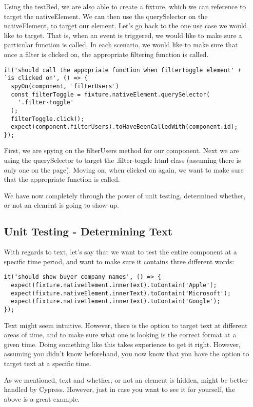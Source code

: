 Using the testBed, we are also able to create a fixture, which we can reference
to target the nativeElement. We can then use the querySelector on the
nativeElement, to target our element. Let's go back to the one use case we
would like to target. That is, when an event is triggered, we would like to
make sure a particular function is called. In each scenario, we would like to
make sure that once a filter is clicked on, the appropriate filtering function
is called.

\begin{lstlisting}
it('should call the appopriate function when filterToggle element' +
`is clicked on', () => {
  spyOn(component, 'filterUsers')
  const filterToggle = fixture.nativeElement.querySelector(
    '.filter-toggle'
  );
  filterToggle.click();
  expect(component.filterUsers).toHaveBeenCalledWith(component.id);
});
\end{lstlisting}

First, we are spying on the filterUsers method for our component. Next we are
using the querySelector to target the .filter-toggle html class (assuming there
is only one on the page). Moving on, when clicked on again, we want to make sure
that the appropriate function is called.

We have now completely through the power of unit testing, determined whether, or
not an element is going to show up.

\subsection{ Unit Testing - Determining Text }
With regards to text, let's say that we want to test the entire component at a
specific time period, and want to make sure it contains three different words:
\begin{lstlisting}
it('should show buyer company names', () => {
  expect(fixture.nativeElement.innerText).toContain('Apple');
  expect(fixture.nativeElement.innerText).toContain('Microsoft');
  expect(fixture.nativeElement.innerText).toContain('Google');
});
\end{lstlisting}

Text might seem intuitive. However, there is the option to target text at
different areas of time, and to make sure what one is looking is the correct
format at a given time. Doing something like this takes experience to get it
right. However, assuming you didn't know beforehand, you now know that you have
the option to target text at a specific time.

As we mentioned, text and whether, or not an element is hidden, might be better
handled by Cypress. However, just in case you want to see it for yourself, the
above is a great example.
